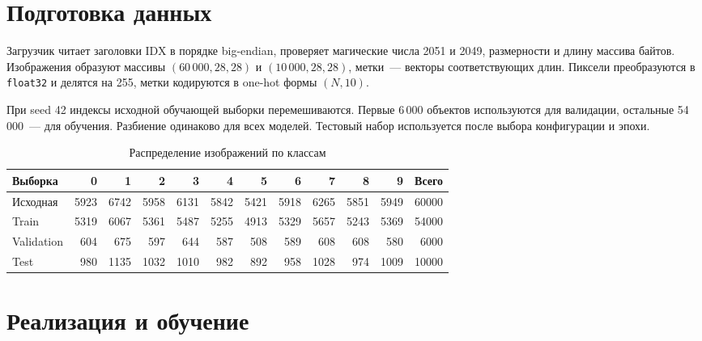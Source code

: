 \clearpage
\section{Подготовка данных}
Загрузчик читает заголовки IDX в порядке big-endian, проверяет магические числа 2051 и 2049, размерности и длину массива байтов. Изображения образуют массивы \((60\,000,28,28)\) и \((10\,000,28,28)\), метки~--- векторы соответствующих длин. Пиксели преобразуются в \texttt{float32} и делятся на 255, метки кодируются в one-hot формы \((N,10)\).

При seed 42 индексы исходной обучающей выборки перемешиваются. Первые 6\,000 объектов используются для валидации, остальные 54\,000~--- для обучения. Разбиение одинаково для всех моделей. Тестовый набор используется после выбора конфигурации и эпохи.

\begin{table}[!ht]
\centering\small
\caption{Распределение изображений по классам}
\begin{tabular}{@{}lrrrrrrrrrrr@{}}
\toprule
Выборка & 0 & 1 & 2 & 3 & 4 & 5 & 6 & 7 & 8 & 9 & Всего\\
\midrule
Исходная & 5923 & 6742 & 5958 & 6131 & 5842 & 5421 & 5918 & 6265 & 5851 & 5949 & 60000\\
Train & 5319 & 6067 & 5361 & 5487 & 5255 & 4913 & 5329 & 5657 & 5243 & 5369 & 54000\\
Validation & 604 & 675 & 597 & 644 & 587 & 508 & 589 & 608 & 608 & 580 & 6000\\
Test & 980 & 1135 & 1032 & 1010 & 982 & 892 & 958 & 1028 & 974 & 1009 & 10000\\
\bottomrule
\end{tabular}
\end{table}

\clearpage
\section{Реализация и обучение}
